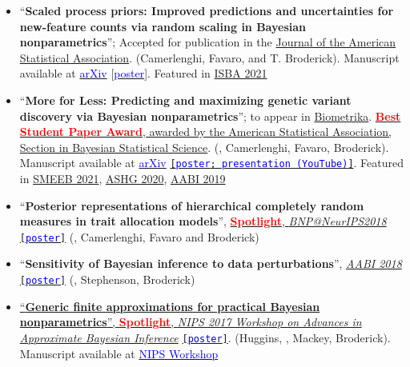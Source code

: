 \begin{itemize}
	\item ``\textbf{Scaled process priors: Improved predictions and uncertainties for new-feature counts via random scaling in Bayesian nonparametrics}''; Accepted for publication in the \href{https://www.tandfonline.com/doi/full/10.1080/01621459.2022.2115918}{Journal of the American Statistical Association}. (Camerlenghi, Favaro, \mm and T. Broderick). Manuscript available at \href{https://arxiv.org/pdf/2106.15480.pdf}{\textcolor{blue}{arXiv}} [\href{https://lorenzomasoero.com/files/spp_poster.pdf}{\textcolor{blue}{poster}}]. Featured in \href{https://whova.com/portal/webapp/isbaw_202106/}{ISBA 2021}
	\item ``\textbf{More for Less: Predicting and maximizing genetic variant discovery via Bayesian nonparametrics}''; to appear in \href{https://academic.oup.com/biomet/advance-article-abstract/doi/10.1093/biomet/asab012/6146908?redirectedFrom=PDF}{Biometrika}.  \href{https://community.amstat.org/sbss/home}{\textbf{\textcolor{red}{Best Student Paper Award}}, awarded by the American Statistical Association, Section in Bayesian Statistical Science}. (\mm, Camerlenghi, Favaro, Broderick). Manuscript available at \href{https://arxiv.org/pdf/1912.05516.pdf}{\textcolor{blue}{arXiv}} \href{https://lorenzomasoero.com/files/more_poster.pdf}{\texttt{[\textcolor{blue}{poster}; \href{https://www.youtube.com/watch?v=OQzyWf-OXK4&ab_channel=TamaraBroderick}{\textcolor{blue}{presentation (YouTube)}}]}}. Featured in \href{https://liphlab.github.io/SMEEB2021/files/SMEEB2021_abstract_booklet.pdf}{SMEEB 2021}, \href{https://www.ashg.org/meetings/2020meeting}{ASHG 2020},  \href{https://openreview.net/pdf?id=B1l8tyhEYr}{AABI 2019}
	\item``\textbf{Posterior representations of hierarchical completely random measures in trait allocation models}'', \href{https://sites.google.com/view/nipsbnp2018/accepted-papers}{\textcolor{red}{\textbf{Spotlight}}, \emph{BNP@NeurIPS2018}} \href{https://lorenzomasoero.com/files/bnp_neurips_2018_poster.pdf}{\texttt{[\textcolor{blue}{poster}]}}  (\mm, Camerlenghi, Favaro and Broderick)
 	\item ``\textbf{Sensitivity of Bayesian inference to data perturbations}'', \href{http://approximateinference.org/accepted/}{\emph{AABI 2018}} \href{https://lorenzomasoero.com/files/aabi_2018_poster.pdf}{\texttt{[\textcolor{blue}{poster}]}} (\mm, Stephenson, Broderick)
\item \href{http://www.approximateinference.org/2017/accepted/HugginsEtAl2017.pdf}{``\textbf{Generic finite approximations
for practical Bayesian nonparametrics}'', \textcolor{red}{\textbf{Spotlight}}, \emph{NIPS 2017 Workshop on Advances in Approximate Bayesian Inference}} \href{https://lorenzomasoero.com/files/aabi_2017_poster.pdf}{\texttt{[\textcolor{blue}{poster}]}}.  (Huggins, \mm, Mackey, Broderick). Manuscript available at \href{http://www.approximateinference.org/2017/accepted/HugginsEtAl2017.pdf}{\textcolor{blue}{NIPS Workshop}}
\end{itemize}
